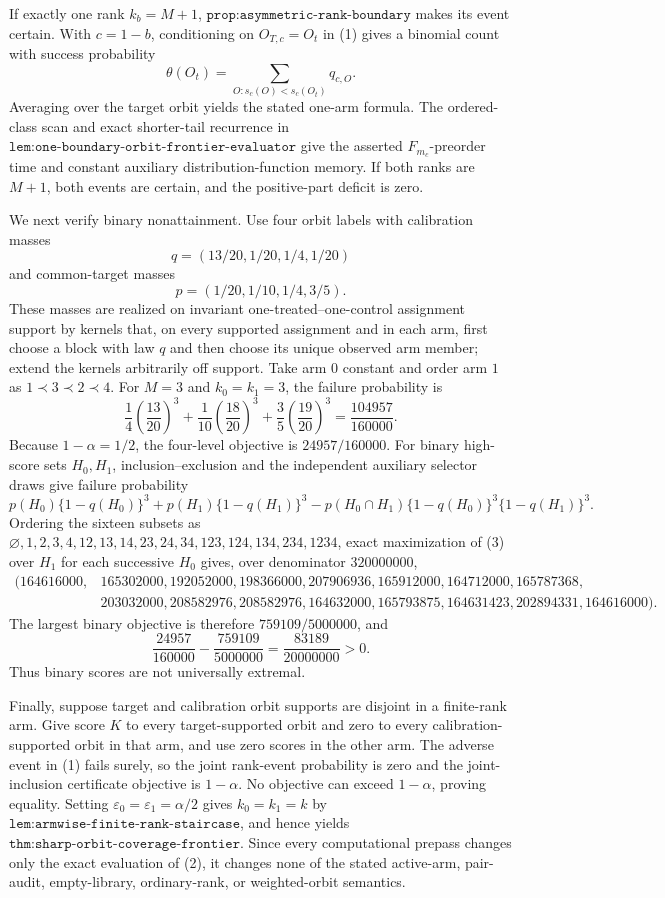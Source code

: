 If exactly one rank \(k_b=M+1\), \(\texttt{prop:asymmetric-rank-boundary}\) makes its event certain. With \(c=1-b\), conditioning on \(O_{T,c}=O_t\) in (1) gives a binomial count with success probability
\[
\theta(O_t)=\sum_{O:s_c(O)<s_c(O_t)}q_{c,O}.
\]
Averaging over the target orbit yields the stated one-arm formula. The ordered-class scan and exact shorter-tail recurrence in \(\texttt{lem:one-boundary-orbit-frontier-evaluator}\) give the asserted \(F_{m_c}\)-preorder time and constant auxiliary distribution-function memory. If both ranks are \(M+1\), both events are certain, and the positive-part deficit is zero.

We next verify binary nonattainment. Use four orbit labels with calibration masses
\[
q=(13/20,1/20,1/4,1/20)
\]
and common-target masses
\[
p=(1/20,1/10,1/4,3/5).
\]
These masses are realized on invariant one-treated--one-control assignment support by kernels that, on every supported assignment and in each arm, first choose a block with law \(q\) and then choose its unique observed arm member; extend the kernels arbitrarily off support. Take arm \(0\) constant and order arm \(1\) as \(1\prec3\prec2\prec4\). For \(M=3\) and \(k_0=k_1=3\), the failure probability is
\[
\frac14\left(\frac{13}{20}\right)^3
+\frac1{10}\left(\frac{18}{20}\right)^3
+\frac35\left(\frac{19}{20}\right)^3
=\frac{104957}{160000}.
\]
Because \(1-\alpha=1/2\), the four-level objective is \(24957/160000\). For binary high-score sets \(H_0,H_1\), inclusion--exclusion and the independent auxiliary selector draws give failure probability
\[
p(H_0)\{1-q(H_0)\}^3+p(H_1)\{1-q(H_1)\}^3
-p(H_0\cap H_1)\{1-q(H_0)\}^3\{1-q(H_1)\}^3.
\tag{3}
\]
Ordering the sixteen subsets as \(\varnothing,1,2,3,4,12,13,14,23,24,34,123,124,134,234,1234\), exact maximization of (3) over \(H_1\) for each successive \(H_0\) gives, over denominator \(320000000\),
\[
\begin{split}
(164616000,&165302000,192052000,198366000,207906936,165912000,164712000,165787368,\\
&203032000,208582976,208582976,164632000,165793875,164631423,202894331,164616000).
\end{split}
\]
The largest binary objective is therefore \(759109/5000000\), and
\[
\frac{24957}{160000}-\frac{759109}{5000000}
=\frac{83189}{20000000}>0.
\]
Thus binary scores are not universally extremal.

Finally, suppose target and calibration orbit supports are disjoint in a finite-rank arm. Give score \(K\) to every target-supported orbit and zero to every calibration-supported orbit in that arm, and use zero scores in the other arm. The adverse event in (1) fails surely, so the joint rank-event probability is zero and the joint-inclusion certificate objective is \(1-\alpha\). No objective can exceed \(1-\alpha\), proving equality. Setting \(\varepsilon_0=\varepsilon_1=\alpha/2\) gives \(k_0=k_1=k\) by \(\texttt{lem:armwise-finite-rank-staircase}\), and hence yields \(\texttt{thm:sharp-orbit-coverage-frontier}\). Since every computational prepass changes only the exact evaluation of (2), it changes none of the stated active-arm, pair-audit, empty-library, ordinary-rank, or weighted-orbit semantics.